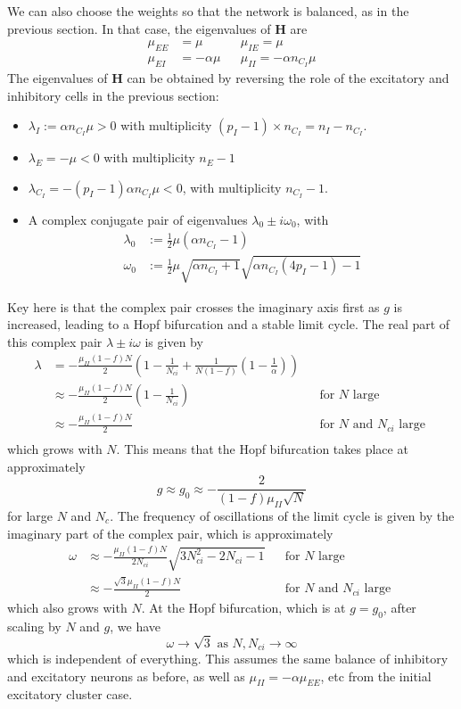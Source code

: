 \documentclass[11pt,reqno]{amsart}
\newcommand{\Hvec}{\mathbf{H}}
\begin{document}
We can also choose the weights so that the network is balanced, as in the previous section. In that case, the eigenvalues of $\Hvec$ are
\begin{align*}
\mu_{EE} &= \mu && \mu_{IE} = \mu \\
\mu_{EI} &= -\alpha \mu && \mu_{II} = -\alpha n_{C_I} \mu
\end{align*}
The eigenvalues of $\Hvec$ can be obtained by reversing the role of the excitatory and inhibitory cells in the previous section:
\begin{itemize}
\item $\lambda_I := \alpha n_{C_I} \mu > 0$ with multiplicity $(p_I-1) \times n_{C_I} = n_I - n_{C_I}$.
\item $\lambda_E = -\mu < 0$ with multiplicity $n_E - 1$
\item $\lambda_{C_I} = -(p_I-1) \alpha n_{C_I} \mu < 0$, with multiplicity $n_{C_I} -1$.
\item A complex conjugate pair of eigenvalues $\lambda_0 \pm i \omega_0$, with 
\begin{align*}
    \lambda_0 &:= \frac{1}{2}\mu(\alpha n_{C_I} - 1)
      \\
    \omega_0 &:= \frac{1}{2}\mu \sqrt{ \alpha n_{C_I}+1} \sqrt{\alpha n_{C_I}(4p_I - 1) - 1}
\end{align*}
\end{itemize}



Key here is that the complex pair crosses the imaginary axis first as $g$ is increased, leading to a Hopf bifurcation and a stable limit cycle. The real part of this complex pair $\lambda \pm i \omega$ is given by
\begin{align*}
\lambda &= -\frac{\mu_{II} (1-f)N}{2}\left( 1 - \frac{1}{N_{ci}} + \frac{1}{N(1-f)}\left( 1 - \frac{1}{\alpha} \right) \right) \\
&\approx -\frac{\mu_{II} (1-f)N}{2}\left( 1 - \frac{1}{N_{ci}} \right) && \text{for $N$ large } \\
&\approx -\frac{\mu_{II} (1-f)N}{2} && \text{for $N$ and $N_{ci}$ large } \\
\end{align*}
which grows with $N$. This means that the Hopf bifurcation takes place at approximately
\[
g \approx g_0 \approx -\frac{2}{(1-f)\mu_{II}\sqrt{N}} 
\]
for large $N$ and $N_c$. The frequency of oscillations of the limit cycle is given by the imaginary part of the complex pair, which is approximately
\begin{align*}
\omega &\approx -\frac{\mu_{II} (1-f)N}{2 N_{ci} } \sqrt{ 3 N_{ci}^2 - 2 N_{ci} - 1} && \text{for $N$ large } \\
&\approx -\frac{\sqrt{3} \mu_{II} (1-f)N}{2 } && \text{for $N$ and $N_{ci}$ large }
\end{align*}
which also grows with $N$. At the Hopf bifurcation, which is at $g = g_0$, after scaling by $N$ and $g$, we have
\[
\omega \rightarrow \sqrt{3} \text{ as } N, N_{ci} \rightarrow \infty
\]
which is independent of everything. This assumes the same balance of inhibitory and excitatory neurons as before, as well as $\mu_{II} = -\alpha \mu_{EE}$, etc from the initial excitatory cluster case. 
\end{document}
